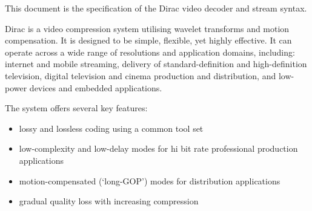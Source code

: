 
This document is the specification of the Dirac video decoder and stream syntax.

Dirac is a video compression system utilising wavelet transforms and motion
compensation. It is designed to be simple, flexible, yet highly effective. 
It can operate across a wide range of resolutions and
application domains, including: internet and mobile streaming, delivery of 
standard-definition and high-definition
television, digital television and cinema production and distribution,
and low-power devices and embedded applications.

The system offers several key features:
\begin{itemize}
  \item lossy and lossless coding using a common tool set
    \item low-complexity and low-delay modes for hi bit rate professional 
production applications
  \item motion-compensated (`long-GOP') modes for distribution applications
	\item gradual quality loss with increasing compression 
\end{itemize}


